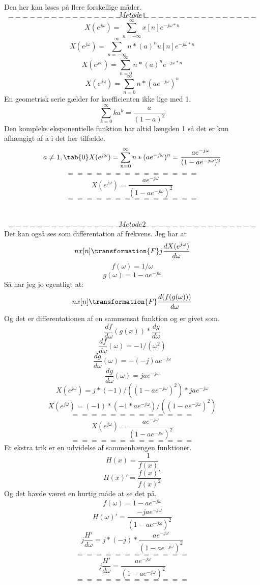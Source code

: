 \begin{Udledninger}
\begin{underrubrik}
    \end{underrubrik}
    \begin{underrubrik}
        Den her kan løses på flere forskellige måder. 
        \[Metode 1\]
        \[-----------------------------------\]
        \[X(e^{j\omega}) = \sum_{n = -\infty}^{\infty}x[n]e^{-j\omega*n}\]
        \[X(e^{j\omega}) = \sum_{n = -\infty}^{\infty}n*(a)^nu[n]e^{-j\omega*n}\]
        \[X(e^{j\omega}) = \sum_{n = 0}^{\infty}n*(a)^ne^{-j\omega*n}\]
        \[X(e^{j\omega}) = \sum_{n = 0}^{\infty}n*(ae^{-j\omega})^n\]
        En geometrisk serie gælder for koefficienten ikke lige med 1. 
        \[\sum_{k=0}^{\infty}k a^{k}=\frac{a}{(1-a)^{2}}\]
        Den kompleks eksponentielle funktion har altid længden 1 så det er kun afhængigt af a i det her tilfælde.
        \[a \neq 1,\tab{0} X(e^{j\omega}) = \sum_{n = 0}^{\infty}n*(ae^{-j\omega})^n = \frac{ae^{-j\omega}}{(1 - ae^{-j\omega})^2}\]
        \[==============\]
        \[X(e^{j\omega}) = \frac{ae^{-j\omega}}{(1 - ae^{-j\omega})^2}\]
        \[==============\]\\\\

        \[Metode 2\]
        \[-----------------------------------\]
        Det kan også ses som differentation af frekvens. Jeg har at 
        \[n x[n] \transformation{F} j{\frac{d X(e^{j\omega})}{d\omega}} \]
        \[f(\omega) = 1/\omega\]
        \[g(\omega) = 1 - ae^{-j\omega}\]
        Så har jeg jo egentligt at: 
        \[n x[n] \transformation{F} \frac{d(f(g(\omega)))}{d\omega}\]
        Og det er differentationen af en sammensat funktion og er givet som.
        \[\frac{df}{d\omega}(g(x)) * \frac{dg}{d\omega}\]
        \[\frac{df}{d\omega}(\omega) = -1/(\omega^2)\]
        \[\frac{dg}{d\omega}(\omega) = - (-j)ae^{-j\omega}\]
        \[\frac{dg}{d\omega}(\omega) = jae^{-j\omega}\]
        \[X(e^{j\omega}) = j * (-1)/((1 - ae^{-j\omega})^2) * jae^{-j\omega}\]
        \[X(e^{j\omega}) = (-1) * (-1 * ae^{-j\omega})/((1 - ae^{-j\omega})^2)\]
        \[=============\]
        \[X(e^{j\omega}) = \frac{ae^{-j\omega}}{(1 - ae^{-j\omega})^2}\]
        \[=============\]
        Et ekstra trik er en udvidelse af sammenhængen funktioner. 
        \[H(x)  = \frac{1}{f(x)}\]
        \[H(x)' = \frac{f(x)'}{f(x)^2}\]
        Og det havde været en hurtig måde at se det på. 
        \[f(\omega) = 1 - ae^{-j\omega}\]
        \[H(\omega)' = \frac{-jae^{-j\omega}}{(1 - ae^{-j\omega})^2}\]
        \[j\frac{H'}{d\omega} = j*(-j)*\frac{ae^{-j\omega}}{(1 - ae^{-j\omega})^2}\]
        \[============\]
        \[j\frac{H'}{d\omega} = \frac{ae^{-j\omega}}{(1 - ae^{-j\omega})^2}\]
        \[============\]


\end{underrubrik}
\end{Udledninger}
